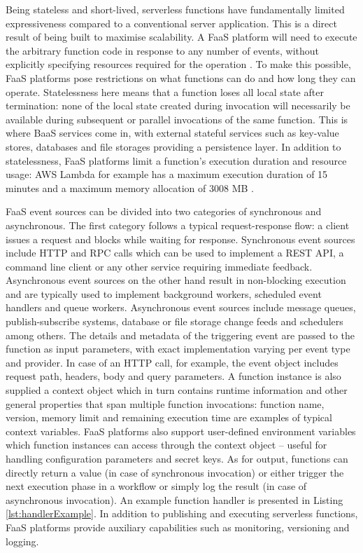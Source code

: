 Being stateless and short-lived, serverless functions have fundamentally limited expressiveness compared to a conventional server application. This is a direct result of being built to maximise scalability. A FaaS platform will need to execute the arbitrary function code in response to any number of events, without explicitly specifying resources required for the operation \parencite{buyya2017manifesto}. To make this possible, FaaS platforms pose restrictions on what functions can do and how long they can operate. Statelessness here means that a function loses all local state after termination: none of the local state created during invocation will necessarily be available during subsequent or parallel invocations of the same function. This is where BaaS services come in, with external stateful services such as key-value stores, databases and file storages providing a persistence layer. In addition to statelessness, FaaS platforms limit a function's execution duration and resource usage: AWS Lambda for example has a maximum execution duration of 15 minutes and a maximum memory allocation of 3008 MB \parencite{awslambda0218}.

FaaS event sources can be divided into two categories of synchronous and asynchronous. The first category follows a typical request-response flow: a client issues a request and blocks while waiting for response. Synchronous event sources include HTTP and RPC calls which can be used to implement a REST API, a command line client or any other service requiring immediate feedback. Asynchronous event sources on the other hand result in non-blocking execution and are typically used to implement background workers, scheduled event handlers and queue workers. Asynchronous event sources include message queues, publish-subscribe systems, database or file storage change feeds and schedulers among others. The details and metadata of the triggering event are passed to the function as input parameters, with exact implementation varying per event type and provider. In case of an HTTP call, for example, the event object includes request path, headers, body and query parameters. A function instance is also supplied a context object which in turn contains runtime information and other general properties that span multiple function invocations: function name, version, memory limit and remaining execution time are examples of typical context variables. FaaS platforms also support user-defined environment variables which function instances can access through the context object -- useful for handling configuration parameters and secret keys. As for output, functions can directly return a value (in case of synchronous invocation) or either trigger the next execution phase in a workflow or simply log the result (in case of asynchronous invocation). An example function handler is presented in Listing \ref{lst:handlerExample}. In addition to publishing and executing serverless functions, FaaS platforms provide auxiliary capabilities such as monitoring, versioning and logging. \parencite{cncf18serverlessWG}

